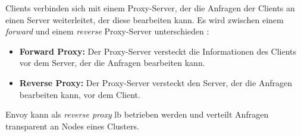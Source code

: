 Clients verbinden sich mit einem Proxy-Server, der die Anfragen der Clients an einen Server weiterleitet, der diese bearbeiten kann. Es wird zwischen einem \textit{forward} und einem \textit{reverse} Proxy-Server unterschieden \cite{WhatReverseProxy}:
\begin{itemize}
  \item \textbf{Forward Proxy:} Der Proxy-Server versteckt die Informationen des Clients vor dem Server, der die Anfragen bearbeiten kann.
  \item \textbf{Reverse Proxy:} Der Proxy-Server versteckt den Server, der die Anfragen bearbeiten kann, vor dem Client.
\end{itemize}
Envoy kann als \textit{reverse proxy} \acl{lb} betrieben werden und verteilt Anfragen transparent an Nodes eines Clusters.

\newpage
